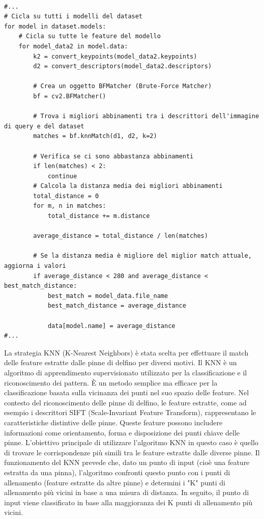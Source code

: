 \documentclass[a4paper,12pt]{report}
\begin{document}
\newpage
      \begin{lstlisting}

#...
# Cicla su tutti i modelli del dataset
for model in dataset.models:
    # Cicla su tutte le feature del modello
    for model_data2 in model.data:
        k2 = convert_keypoints(model_data2.keypoints)
        d2 = convert_descriptors(model_data2.descriptors)

        # Crea un oggetto BFMatcher (Brute-Force Matcher)
        bf = cv2.BFMatcher()

        # Trova i migliori abbinamenti tra i descrittori dell'immagine di query e del dataset
        matches = bf.knnMatch(d1, d2, k=2)

        # Verifica se ci sono abbastanza abbinamenti
        if len(matches) < 2:
            continue
        # Calcola la distanza media dei migliori abbinamenti
        total_distance = 0
        for m, n in matches:
            total_distance += m.distance
        
        average_distance = total_distance / len(matches)

        # Se la distanza media è migliore del miglior match attuale, aggiorna i valori
        if average_distance < 280 and average_distance < best_match_distance:
            best_match = model_data.file_name
            best_match_distance = average_distance

            data[model.name] = average_distance
#...
      \end{lstlisting}
      La strategia KNN (K-Nearest Neighbors) è stata scelta per effettuare il match delle feature estratte dalle pinne di delfino per diversi motivi. Il KNN è un algoritmo di apprendimento supervisionato utilizzato per la classificazione e il riconoscimento dei pattern. È un metodo semplice ma efficace per la classificazione basata sulla vicinanza dei punti nel suo spazio delle feature.
      Nel contesto del riconoscimento delle pinne di delfino, le feature estratte, come ad esempio i descrittori SIFT (Scale-Invariant Feature Transform), rappresentano le caratteristiche distintive delle pinne. Queste feature possono includere informazioni come orientamento, forma e disposizione dei punti chiave delle pinne.
      L'obiettivo principale di utilizzare l'algoritmo KNN in questo caso è quello di trovare le corrispondenze più simili tra le feature estratte dalle diverse pinne. Il funzionamento del KNN prevede che, dato un punto di input (cioè una feature estratta da una pinna), l'algoritmo confronti questo punto con i punti di allenamento (feature estratte da altre pinne) e determini i "K" punti di allenamento più vicini in base a una misura di distanza. In seguito, il punto di input viene classificato in base alla maggioranza dei K punti di allenamento più vicini.
\end{document}
